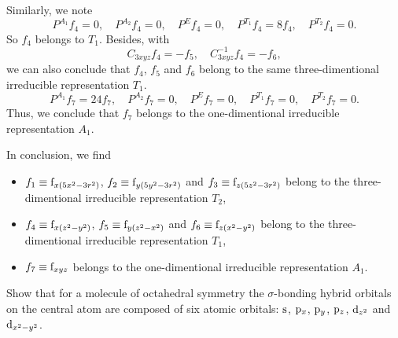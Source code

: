 \documentclass[a4paper]{book}
\newcommand{\orb}[1]{{\rm #1}}
\newcommand{\orbs}{\orb{s}}
\newcommand{\orbp}{\orb{p}}
\newcommand{\orbd}{\orb{d}}
\newcommand{\orbf}{\orb{f}}
\begin{document}
\begin{solution}
		Similarly, we note 
		\begin{equation*}
		P^{A_1} f_4 = 0, \quad	P^{A_2} f_4 = 0, \quad P^E f_4 = 0, \quad P^{T_1} f_4 = 8f_4, \quad P^{T_2} f_4 = 0.
		\end{equation*}
		So $f_4$ belongs to $T_1$. Besides, with
		\begin{equation*}
			C_{3xyz} f_4 = -f_5, \quad C^{-1}_{3xyz} f_4 = -f_6,
		\end{equation*}				
		we can also conclude that $f_4$, $f_5$ and $f_6$ belong to the same three-dimentional irreducible representation $T_1$.
		\begin{equation*}
		P^{A_1} f_7 = 24f_7, \quad	P^{A_2} f_7 = 0, \quad P^E f_7 = 0, \quad P^{T_1} f_7 = 0, \quad P^{T_2} f_7 = 0.
		\end{equation*}
		Thus, we conclude that $f_7$ belongs to the one-dimentional irreducible representation $A_1$.
		
		In conclusion, we find 
		\begin{itemize}
		
		\item $f_1 \equiv \orbf_{x(5x^2-3r^2)}$, $f_2 \equiv \orbf_{y(5y^2-3r^2)}$ and $f_3 \equiv \orbf_{z(5z^2-3r^2)}$ belong to the three-dimentional irreducible representation $T_2$,

		\item $f_4 \equiv \orbf_{x(z^2-y^2)}$, $f_5 \equiv \orbf_{y(z^2-x^2)}$ and $f_6 \equiv \orbf_{z(x^2-y^2)}$ belong to the three-dimentional irreducible representation $T_1$,
		
		\item $f_7 \equiv \orbf_{xyz}$ belongs to the one-dimentional irreducible representation $A_1$.

		\end{itemize}				
		 
		
	\end{solution}
	
	\begin{exercise}
		Show that for a molecule of octahedral symmetry the $\sigma$-bonding hybrid orbitals on the central atom are composed of six atomic orbitals: $\orbs$, $\orbp_x$, $\orbp_y$, $\orbp_z$, $\orbd_{z^2}$ and $\orbd_{x^2-y^2}$.
	\end{exercise}
\end{document}
